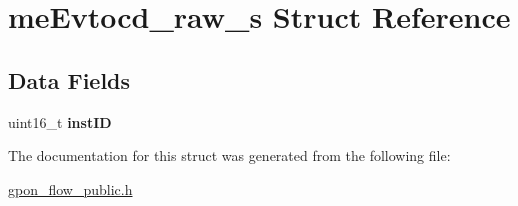 \hypertarget{structmeEvtocd__raw__s}{}\section{me\+Evtocd\+\_\+raw\+\_\+s Struct Reference}
\label{structmeEvtocd__raw__s}
\subsection*{Data Fields}
\begin{DoxyCompactItemize}
\item 
\mbox{\label{structmeEvtocd__raw__s_a9796f21d8926aaf29a720a28ff98ddfd}} 
uint16\+\_\+t {\bfseries inst\+ID}
\end{DoxyCompactItemize}


The documentation for this struct was generated from the following file\+:\begin{DoxyCompactItemize}
\item 
\hyperlink{gpon__flow__public_8h}{gpon\+\_\+flow\+\_\+public.\+h}\end{DoxyCompactItemize}
